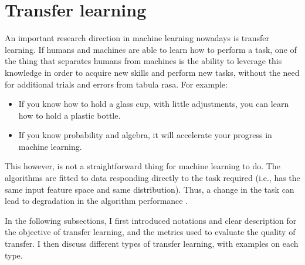 \section{Transfer learning}\label{sec:transfer_learning}
  \par An important research direction in machine learning nowadays is transfer learning. If humans and machines are able to learn how to perform a task, one of the thing that separates humans from machines is the ability to leverage this knowledge in order to acquire new skills and perform new tasks, without the need for additional trials and errors from tabula rasa. For example:
  \begin{itemize}[noitemsep]
      \item If you know how to hold a glass cup, with little adjustments, you can learn how to hold a plastic bottle.
      \item If you know probability and algebra, it will accelerate your progress in machine learning.
  \end{itemize}
  This however, is not a straightforward thing for machine learning to do. The algorithms are fitted to data responding directly to the task required (i.e., has the same input feature space and same distribution). Thus, a change in the task can lead to degradation in the algorithm performance \citep{shimodaira2000improving,pan2009survey,weiss2016survey,DBLP:journals/corr/abs-1808-01974}.

  \par In the following subsections, I first introduced notations and clear description for the objective of transfer learning, and the metrics used to evaluate the quality of transfer. I then discuss different types of transfer learning, with examples on each type.

